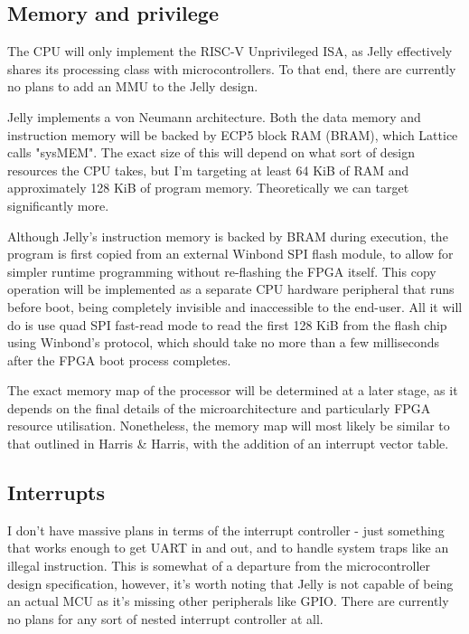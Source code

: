 \documentclass{article}
\begin{document}

\subsection{Memory and privilege}
The CPU will only implement the RISC-V Unprivileged ISA, as Jelly effectively shares its processing class
with microcontrollers. To that end, there are currently no plans to add an MMU to the Jelly design.

Jelly implements a von Neumann architecture. Both the data memory and instruction memory will be backed by
ECP5 block RAM (BRAM), which Lattice calls "sysMEM". The exact size of this will depend on what sort of
design resources the CPU takes, but I'm targeting at least 64 KiB of RAM and approximately 128 KiB of program
memory. Theoretically we can target significantly more.

Although Jelly's instruction memory is backed by BRAM during execution, the program is first copied from an
external Winbond SPI flash module, to allow for simpler runtime programming without re-flashing the FPGA
itself. This copy operation will be implemented as a separate CPU hardware peripheral that runs before boot,
being completely invisible and inaccessible to the end-user. All it will do is use quad SPI fast-read mode to
read the first 128 KiB from the flash chip using Winbond's protocol, which should take no more than a few
milliseconds after the FPGA boot process completes.

The exact memory map of the processor will be determined at a later stage, as it depends on the final details
of the microarchitecture and particularly FPGA resource utilisation. Nonetheless, the memory map will most
likely be similar to that outlined in Harris \& Harris, with the addition of an interrupt vector table.

\subsection{Interrupts}
I don't have massive plans in terms of the interrupt controller - just something that works enough to get
UART in and out, and to handle system traps like an illegal instruction. This is somewhat of a departure from
the microcontroller design specification, however, it's worth noting that Jelly is not capable of being an
actual MCU as it's missing other peripherals like GPIO. There are currently no plans for any sort of nested
interrupt controller at all.
\end{document}
